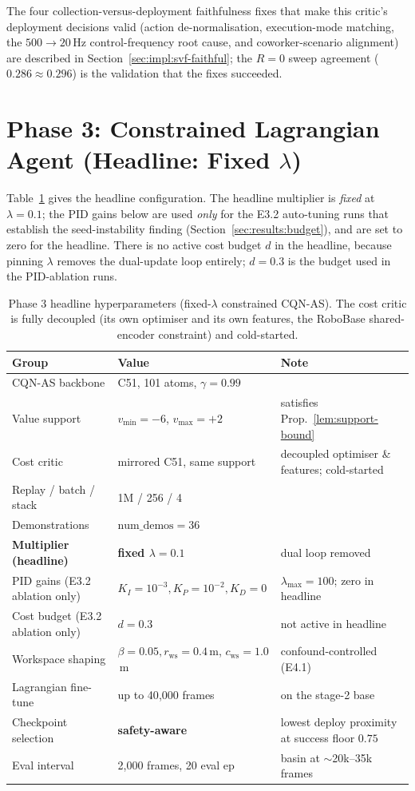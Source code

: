 \documentclass[11pt,a4paper]{report}
\newcommand{\cqnas}{CQN-AS}
\begin{document}
The four collection-versus-deployment faithfulness fixes that make
this critic's deployment decisions valid (action de-normalisation,
execution-mode matching, the $500 \rightarrow 20$\,Hz control-frequency
root cause, and coworker-scenario alignment) are described in
Section~\ref{sec:impl:svf-faithful}; the $R = 0$ sweep agreement
($0.286 \approx 0.296$) is the validation that the fixes succeeded.

\section{Phase 3: Constrained Lagrangian Agent (Headline: Fixed $\lambda$)}
\label{app:hparams:lagrangian}

Table~\ref{tab:app-hparams-lagrangian} gives the headline
configuration. The headline multiplier is \emph{fixed} at
$\lambda = 0.1$; the PID gains below are used \emph{only} for the
E3.2 auto-tuning runs that establish the seed-instability finding
(Section~\ref{sec:results:budget}), and are set to zero for the
headline. There is no active cost budget $d$ in the headline, because
pinning $\lambda$ removes the dual-update loop entirely; $d = 0.3$ is
the budget used in the PID-ablation runs.

\begin{table}[h]
\centering
\small
\caption{Phase 3 headline hyperparameters (fixed-$\lambda$
constrained \cqnas{}). The cost critic is fully decoupled (its own
optimiser and its own features, the RoboBase shared-encoder
constraint) and cold-started.}
\label{tab:app-hparams-lagrangian}
\begin{tabular}{lll}
\toprule
Group & Value & Note \\
\midrule
\cqnas{} backbone & C51, 101 atoms, $\gamma = 0.99$ & \cite{seo2024cqnas} \\
Value support & $v_{\min} = -6$, $v_{\max} = +2$ & satisfies Prop.~\ref{lem:support-bound} \\
Cost critic & mirrored C51, same support & decoupled optimiser \& features; cold-started \\
Replay / batch / stack & 1M / 256 / 4 & \\
Demonstrations & $\text{num\_demos} = 36$ & \\
\textbf{Multiplier (headline)} & \textbf{fixed $\lambda = 0.1$} & dual loop removed \\
PID gains (E3.2 ablation only) & $K_I{=}10^{-3}, K_P{=}10^{-2}, K_D{=}0$ & $\lambda_{\max}{=}100$; zero in headline \\
Cost budget (E3.2 ablation only) & $d = 0.3$ & not active in headline \\
Workspace shaping & $\beta{=}0.05, r_{\mathrm{ws}}{=}0.4$\,m, $c_{\mathrm{ws}}{=}1.0$\,m & confound-controlled (E4.1) \\
Lagrangian fine-tune & up to 40{,}000 frames & on the stage-2 base \\
Checkpoint selection & \textbf{safety-aware} & lowest deploy proximity at success floor $0.75$ \\
Eval interval & 2{,}000 frames, 20 eval ep & basin at $\sim$20k--35k frames \\
\bottomrule
\end{tabular}
\end{table}
\end{document}
